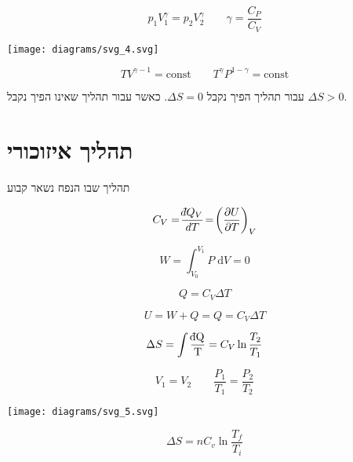 \documentclass{tstextbook}
\begin{document}
\begin{proposition}
$$p_{1}V_{1}^\gamma=p_{2}V_{2}^\gamma \qquad \gamma = \frac{C_{P}}{C_{V}}$$

\end{proposition}
\texttt{[image: diagrams/svg\_4.svg]}
\begin{proposition}
$$TV^{\gamma-1}=\mathrm{const}\qquad T^\gamma P^{1-\gamma}=\mathrm{const}$$

\end{proposition}
\begin{proposition}
עבור תהליך הפיך נקבל \(\Delta S = 0\). כאשר עבור תהליך שאינו הפיך נקבל \(\Delta S > 0\).

\end{proposition}
\section{תהליך איזוכורי}

\begin{definition}
תהליך שבו הנפח נשאר קבוע

\end{definition}
\begin{proposition}
$$C_{V}=\!\frac{\;\bar{}\mkern-7.5mu dQ_{V}}{d T}\!=\!\left(\frac{\partial U}{\partial T}\right)_{V}$$

\end{proposition}
\begin{proposition}
$$W=\int_{V_{0}}^{V_{1}} P \;\mathrm{d}V=0$$

\end{proposition}
\begin{proposition}
$$Q=C_{V}\Delta T$$

\end{proposition}
\begin{proposition}
$$U=W+Q = Q=C_{V}\Delta T$$

\end{proposition}
\begin{proposition}
$$\Delta S = \int \mathrm{\frac{\;\bar{}\mkern-7.5mu dQ}{T}}=C_{V}\ln \frac{T_{2}}{T_{1}}$$

\end{proposition}
\begin{proposition}
$$V_{1} = V_{2}\qquad  \frac{P_{1}}{T_{1}}=\frac{P_{2}}{T_{2}}$$

\end{proposition}
\texttt{[image: diagrams/svg\_5.svg]}
\begin{proposition}
$$\Delta S=n C_{v}\ln{\frac{T_{f}}{T_{i}}}$$

\end{proposition}
\end{document}
